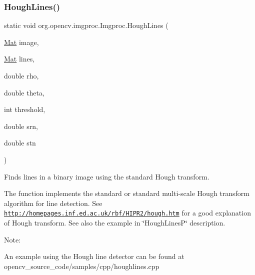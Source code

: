 \subsubsection{\texorpdfstring{Hough\+Lines()}{HoughLines()}\hspace{0.1cm}{\footnotesize\ttfamily [1/2]}}
{\footnotesize\ttfamily static void org.\+opencv.\+imgproc.\+Imgproc.\+Hough\+Lines (\begin{DoxyParamCaption}\item[{\mbox{\hyperlink{classorg_1_1opencv_1_1core_1_1_mat}{Mat}}}]{image,  }\item[{\mbox{\hyperlink{classorg_1_1opencv_1_1core_1_1_mat}{Mat}}}]{lines,  }\item[{double}]{rho,  }\item[{double}]{theta,  }\item[{int}]{threshold,  }\item[{double}]{srn,  }\item[{double}]{stn }\end{DoxyParamCaption})\hspace{0.3cm}{\ttfamily [static]}}

Finds lines in a binary image using the standard Hough transform.

The function implements the standard or standard multi-\/scale Hough transform algorithm for line detection. See \href{http://homepages.inf.ed.ac.uk/rbf/HIPR2/hough.htm}{\tt http\+://homepages.\+inf.\+ed.\+ac.\+uk/rbf/\+H\+I\+P\+R2/hough.\+htm} for a good explanation of Hough transform. See also the example in \char`\"{}\+Hough\+Lines\+P\char`\"{} description.

Note\+:


\begin{DoxyItemize}
\item An example using the Hough line detector can be found at opencv\+\_\+source\+\_\+code/samples/cpp/houghlines.\+cpp 
\end{DoxyItemize}


